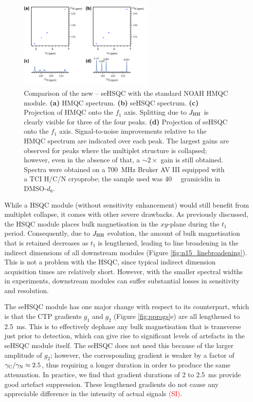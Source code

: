 \documentclass[11pt]{article}
\newcommand*{\carbon}{\ce{^{13}C}}
\newcommand*{\proton}{\ce{^{1}H}}
\newcommand*{\nitrogen}{\ce{^{15}N}}
\newcommand*{\red}[1]{\textcolor{red}{#1}}
\newcommand*{\jhh}{J_{\ce{HH}}}
\newcommand*{\figref}[1]{Figure \ref{fig:#1}}
\newcommand*{\sitodo}{\red{(SI)}}
\newcommand*{\grami}{Spectra were obtained on a \SI{700}{\MHz} Bruker AV III equipped with a TCI H/C/N cryoprobe; the sample used was \SI{40}{\milli\molar} gramicidin in DMSO-$d_6$.}
\begin{document}
\begin{figure}
    \centering
    \includegraphics[width=0.6\textwidth]{./figures/15n_spv2vsm.png}
    \caption{
        Comparison of the new \nitrogen{}--\proton{} seHSQC with the standard NOAH HMQC module.
        \textbf{(a)} HMQC spectrum.
        \textbf{(b)} seHSQC spectrum.
        \textbf{(c)} Projection of HMQC onto the $f_1$ axis.
        Splitting due to $\jhh$ is clearly visible for three of the four peaks.
        \textbf{(d)} Projection of seHSQC onto the $f_1$ axis.
        Signal-to-noise improvements relative to the HMQC spectrum are indicated over each peak.
        The largest gains are observed for peaks where the multiplet structure is collapsed; however, even in the absence of that, a $\sim 2\times$ gain is still obtained.
        \grami{}
    }
    \label{fig:n15}
\end{figure}

While a \nitrogen{} HSQC module (without sensitivity enhancement) would still benefit from multiplet collapse, it comes with other severe drawbacks.
As previously discussed, the HSQC module places bulk magnetisation in the $xy$-plane during the $t_1$ period.
Consequently, due to $\jhh$ evolution, the amount of bulk magnetisation that is retained decreases as $t_1$ is lengthened, leading to line broadening in the indirect dimensions of all downstream modules (\figref{n15_linebroadening}).
This is not a problem with the \carbon{} HSQC, since typical \carbon{} indirect dimension acquisition times are relatively short.
However, with the smaller spectral widths in \nitrogen{} experiments, downstream modules can suffer substantial losses in sensitivity and resolution.

The \nitrogen{} seHSQC module has one major change with respect to its \carbon{} counterpart, which is that the CTP gradients $g_1$ and $g_2$ (\figref{pprogs}e) are all lengthened to \SI{2.5}{\ms}.
This is to effectively dephase any bulk magnetisation that is transverse just prior to detection, which can give rise to significant levels of artefacts in the seHSQC module itself.
The \carbon{} seHSQC does not need this because of the larger amplitude of $g_2$; however, the corresponding \nitrogen{} gradient is weaker by a factor of $\gamma_{\ce{C}}/\gamma_{\ce{N}} \approx 2.5$, thus requiring a longer duration in order to produce the same attenuation.
In practice, we find that gradient durations of 2 to \SI{2.5}{\ms} provide good artefact suppression.
These lengthened gradients do not cause any appreciable difference in the intensity of actual signals \sitodo{}.
\end{document}

